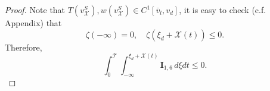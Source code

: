 \documentclass[10pt,a4paper]{amsart}
\def\T{\mathcal{T}}
\def\X{\mathcal{X}}
\def\avl{\overline{v}_l}
\def\p{\partial}
\def\vsx{v^S_{\mathcal{X}}}
\def\wh{\hat{w}}
\begin{document}
\begin{proof}
	Note that $T(\vsx),w(\vsx) \in C^1[\avl,v_d]$, it is easy to check (c.f. Appendix) that
	\begin{equation}\label{interact2}
		\zeta(-\infty)=0,\quad \zeta(\xi_d+\X(t))\leq 0.
	\end{equation}
	Therefore, 
	\begin{equation}\label{flux-term2}
		\int_{0}^{\T}\int_{-\infty}^{\xi_{d}+\X(t)}\textbf{I}_{1,6}\,d\xi dt\leq 0.
	\end{equation}
%	

\end{proof}
\end{document}
